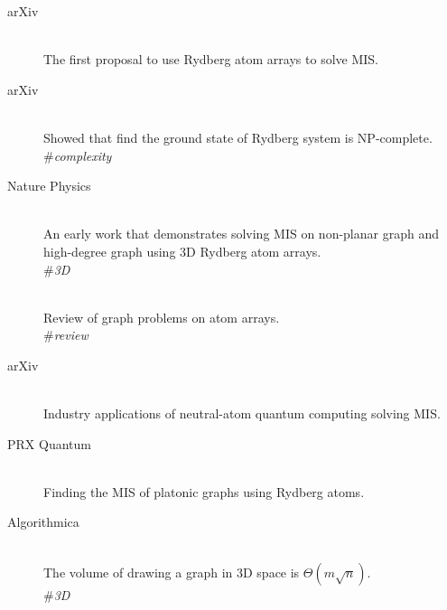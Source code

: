 \documentclass{article}
\newcommand{\CiteDesc}[2]{\item[\cite{#1} #2] \hfill \\}
\newcommand{\Keywords}[1]{\\ \#\textit{#1}}
\begin{document}
\begin{description}
  \CiteDesc{pichler2018quantum}{arXiv}
  The first proposal to use Rydberg atom arrays to solve MIS.

  \CiteDesc{pichler2018computational}{arXiv}
  Showed that find the ground state of Rydberg system is NP-complete.
  \Keywords{complexity}

  \CiteDesc{kim2022rydberg}{Nature Physics}
  An early work that demonstrates solving MIS on non-planar graph and high-degree graph using 3D Rydberg atom arrays.
  \Keywords{3D}

  \CiteDesc{dalyac2024graph}{}
  Review of graph problems on atom arrays.
  \Keywords{review}

  \CiteDesc{wurtz2024industry}{arXiv}
  Industry applications of neutral-atom quantum computing solving MIS.

  \CiteDesc{byun2022finding}{PRX Quantum}
  Finding the MIS of platonic graphs using Rydberg atoms.

  \CiteDesc{biedl2006three}{Algorithmica}
  The volume of drawing a graph in 3D space is $\Theta(m\sqrt{n})$.
  \Keywords{3D}
\end{description}



\end{document}
